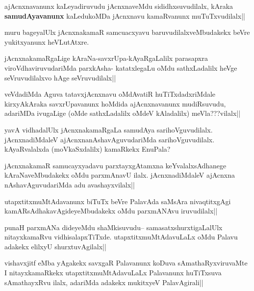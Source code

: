 \begin{artha}
ajAcnxnavanunx kaLeyadiruvudu jAcnxnaveMdu sididhxsuvudilalx, kAraka \textbf{samudAyavanunx} kaLedukoMDa jAcnxnavu kamaRvanunx muTuTxvudilalx||
\end{artha}

\begin{artha}
muru bageyalUlx jAcnxnakamaR samcuacxyavu baruvudilalxveMbudakekx beVre yukitxyanunx heVLutAtxre.
\end{artha}

\begin{artha}
jAcnxnakamaRgaLige kAraNa-savxrUpa-kAyaRgaLalilx parasapxra viroVdhaviruvudariMda parxkAsha- katatxlegaLu oMdu sathxLadalilx heVge seVruvudilalxvo hAge seVruvudilalx||
\end{artha}

\begin{artha}
veVdadiMda Aguva tatavxjAcnxnavu oMdAvatiR huTiTxdadxriMdale kirxyAkAraka savxrUpavanunx hoMdida ajAcnxnavanunx mudiRsuvudu, adariMDa ivugaLige (oMde sathxLadalilx oMdeV kAladalilx) meVla???vilalx||
\end{artha}

\begin{artha}
yavA vidhadalUlx jAcnxnakamaRgaLa samudAya sarihoVguvudilalx. jAcnxnadiMdaleV ajAcnxnanAshavAguvudariMda sarihoVguvudilalx. kAyaRvalalxda (moVkaSxdalilx) kamaRkekx EnuPala?
\end{artha}

\begin{artha}
jAcnxnakamaR samucayxyadavu parxtayxgAtamxna keYvalalxsAdhanege kAraNaveMbudakekx oMdu parxmAnavU ilalx. jAcnxnadiMdaleV ajAcnxna nAshavAguvudariMda adu avashayxvilalx||
\end{artha}

\begin{artha}
utapxtitxmuMtAdavanunx biTuTx beVre PalavAda saMsAra nivaqtitxgAgi kamARsAdhakavAgideyeMbudakekx oMdu parxmANAvu iruvudilalx||
\end{artha}


\begin{artha}
punaH parxmANa dideyeMdu shaMkisuvudu-- samasatxshurxtigaLalUlx nitayxkamaRvu vidhisalapxTiTxde. utapxtitxmuMtAdavuLaLx oMdu Palavu adakekx elilxyU shurxtuvAgilalx||
\end{artha}

\begin{artha}
vishavxjitf eMba yAgakekx savxgaR Palavanunx koDuva sAmathaRyxviruvaMte I nitayxkamaRkekx utapxtitxmuMtAdavuLaLx Palavanunx huTiTxsuva sAmathayxRvu ilalx, adariMda adakekx mukitxyeV PalavAgirali||
\end{artha}

